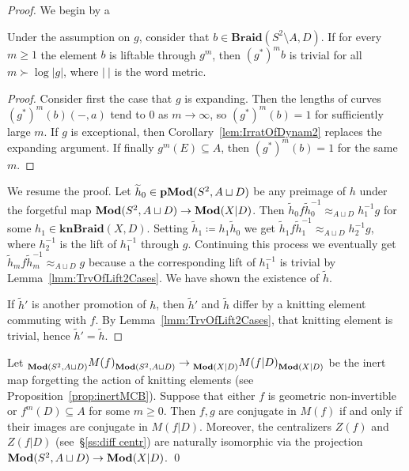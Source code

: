 \documentclass{amsart}
\newcommand\Braid{{\mathbf{Braid}}}
\newcommand\knBraid{{\mathbf{knBraid}}}
\begin{document}
\begin{proof}
  We begin by a
  \begin{lem}\label{lmm:TrvOfLift2Cases}
    Under the assumption on $g$, consider that
    $b\in\Braid(S^2\setminus A,D)$. If for every $m\ge 1$ the element
    $b$ is liftable through $g^m$, then $(g^*)^m b$ is trivial for all
    $m\succ \log |g|$, where $|\ |$ is the word metric.
  \end{lem}
  \begin{proof}
    Consider first the case that $g$ is expanding. Then the lengths of
    curves $(g^*)^m(b)(-,a)$ tend to $0$ as $m\to\infty$, so
    $(g^*)^m(b)=1$ for sufficiently large $m$. If $g$ is exceptional,
    then Corollary~\ref{lem:IrratOfDynam2} replaces the expanding
    argument. If finally $g^m(E)\subseteq A$, then $(g^*)^m(b)=1$ for
    the same $m$.
  \end{proof}

  We resume the proof. Let $\widetilde h_0\in \Mod[p](S^2,A\sqcup D)$
  be any preimage of $h$ under the forgetful map
  $\Mod(S^2,A\sqcup D)\to\Mod(X|D)$. Then
  $\widetilde h_0f \widetilde h_0^{-1}\approx_{A\sqcup D} h_1^{-1}g$
  for some $h_1\in \knBraid(X,D)$. Setting
  $\widetilde h_1\coloneqq h_1 \widetilde h_0$ we get
  $\widetilde h_1f \widetilde h_1^{-1}\approx_{A\sqcup D}h_2^{-1}g$,
  where $h_2^{-1}$ is the lift of $h_1^{-1}$ through $g$. Continuing
  this process we eventually get
  $\widetilde h_m f \widetilde h_m^{-1}\approx_{A\sqcup D} g$ because
  a the corresponding lift of $h_1^{-1}$ is trivial by
  Lemma~\ref{lmm:TrvOfLift2Cases}. We have shown the existence of
  $\widetilde h$.

  If $\widetilde h'$ is another promotion of $h$, then $\widetilde h'$
  and $\widetilde h$ differ by a knitting element commuting with $f$.
  By Lemma~\ref{lmm:TrvOfLift2Cases}, that knitting element is
  trivial, hence $\widetilde h'=\widetilde h$.
\end{proof}

\begin{cor}\label{cor:conj probl reduction}
  Let
  $\subscript{\Mod(S^2,A\sqcup D)}{M(f)}_{\Mod(S^2,A\sqcup
    D)}\to\subscript{\Mod(X|D)}{M(f|D)}_{\Mod(X|D)}$ be the inert map
  forgetting the action of knitting elements (see
  Proposition~\ref{prop:inertMCB}).  Suppose that either $f$ is
  geometric non-invertible or $f^{m}(D)\subseteq A$ for some $m\ge
  0$. Then $f,g$ are conjugate in $M(f)$ if and only if their images
  are conjugate in $M(f|D)$. Moreover, the centralizers $Z(f)$ and
  $Z(f|D)$ (see~\S\ref{ss:diff centr}) are naturally isomorphic via
  the projection $\Mod(S^2,A\sqcup D)\to\Mod(X|D)$.  \qed
\end{cor}
\end{document}
